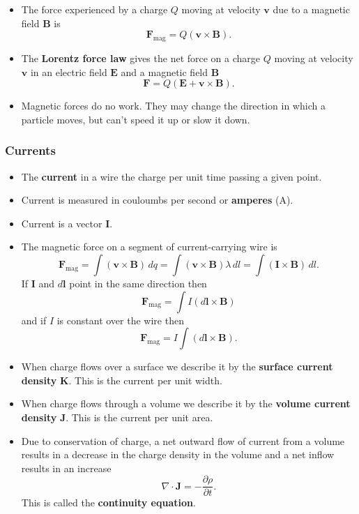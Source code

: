 \documentclass{article}
\renewcommand{\vec}[1]{\boldsymbol{\mathbf{#1}}}
\begin{document}
\begin{itemize}
  \item The force experienced by a charge $Q$ moving at velocity $\vec{v}$ due to a magnetic field $\vec{B}$ is \[\vec{F}_\text{mag} = Q (\vec{v} \times \vec{B}).\]

  \item The \textbf{Lorentz force law} gives the net force on a charge $Q$ moving at velocity $\vec{v}$ in an electric field $\vec{E}$ and a magnetic field $\vec{B}$ \[\vec{F} = Q (\vec{E} + \vec{v} \times \vec{B}).\]

  \item Magnetic forces do no work. They may change the direction in which a particle moves, but can't speed it up or slow it down.
\end{itemize}

\subsubsection{Currents}

\begin{itemize}
  \item The \textbf{current} in a wire the charge per unit time passing a given point.

  \item Current is measured in couloumbs per second or \textbf{amperes} (A).

  \item Current is a vector $\vec{I}$.

  \item The magnetic force on a segment of current-carrying wire is \[\vec{F}_\text{mag} = \int (\vec{v} \times \vec{B}) \,d q = \int (\vec{v} \times \vec{B}) \lambda \,d l = \int (\vec{I} \times \vec{B}) \,d l.\] If $\vec{I}$ and $d \vec{l}$ point in the same direction then \[\vec{F}_\text{mag} = \int I (d \vec{l} \times \vec{B})\] and if $I$ is constant over the wire then \[\vec{F}_\text{mag} = I \int (d \vec{l} \times \vec{B}).\]

  \item When charge flows over a surface we describe it by the \textbf{surface current density} $\vec{K}$. This is the current per unit width.

  \item When charge flows through a volume we describe it by the \textbf{volume current density} $\vec{J}$. This is the current per unit area.

  \item Due to conservation of charge, a net outward flow of current from a volume results in a decrease in the charge density in the volume and a net inflow results in an increase \[\nabla \cdot \vec{J} = -\frac{\partial \rho}{\partial t}.\] This is called the \textbf{continuity equation}.
\end{itemize}
\end{document}
